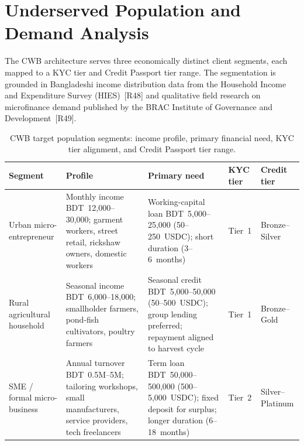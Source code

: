 \section{Underserved Population and Demand Analysis}
\label{sec:target-population}

The CWB architecture serves three economically distinct client segments, each
mapped to a KYC tier and Credit Passport tier range. The segmentation is
grounded in Bangladeshi income distribution data from the Household Income and
Expenditure Survey (HIES)~[R48] and qualitative field research on
microfinance demand published by the BRAC Institute of Governance and
Development~[R49].

\begin{table}[H]
\centering
\caption{CWB target population segments: income profile, primary financial
need, KYC tier alignment, and Credit Passport tier range.}
\label{tab:target-segments}
\small
\renewcommand{\arraystretch}{1.3}
\begin{tabular}{p{2.5cm}p{3.0cm}p{3.0cm}p{1.8cm}p{1.9cm}}
\hline
\textbf{Segment} & \textbf{Profile} & \textbf{Primary need} &
\textbf{KYC tier} & \textbf{Credit tier} \\
\hline
Urban micro-entrepreneur &
  Monthly income BDT~12,000--30,000; garment workers, street retail,
  rickshaw owners, domestic workers &
  Working-capital loan BDT~5,000--25,000 (50--250~USDC); short duration
  (3--6~months) &
  Tier~1 &
  Bronze--Silver \\
Rural agricultural household &
  Seasonal income BDT~6,000--18,000; smallholder farmers, pond-fish
  cultivators, poultry farmers &
  Seasonal credit BDT~5,000--50,000 (50--500~USDC); group lending preferred;
  repayment aligned to harvest cycle &
  Tier~1 &
  Bronze--Gold \\
SME / formal micro-business &
  Annual turnover BDT~0.5M--5M; tailoring workshops, small manufacturers,
  service providers, tech freelancers &
  Term loan BDT~50,000--500,000 (500--5,000~USDC); fixed deposit for
  surplus; longer duration (6--18~months) &
  Tier~2 &
  Silver--Platinum \\
\hline
\end{tabular}
\end{table}

